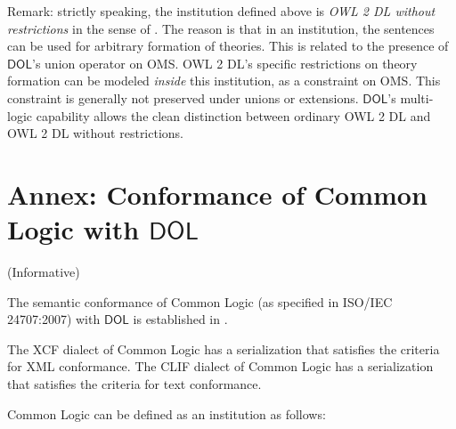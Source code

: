 \documentclass[10pt,fleqn,final]{scrreprt}
\newcommand{\cbe}[0]{\color{black}\xspace} %
\newcommand*{\DOL}{\ensuremath{\mathsf{DOL}}\xspace}
\newcommand{\informative}[0]{{\begin{center}{\Large{(Informative})}\end{center}} \bigskip}
\newcommand{\nisref}[1]{#1}
\newcommand{\infannex}[1]{ \chapter{Annex: #1}  \informative }
\newenvironment{definitions}[0]{\medskip }{}
\begin{document}
\begin{definitions}
\cbe



Remark: strictly speaking, the institution defined above is
\emph{{OWL} 2 DL without restrictions} in the sense of
\cite{DBLP:conf/owled/SchneiderRS13}. The reason is that in an
institution, the sentences can be used for arbitrary formation of
theories. This is related to the presence of \DOL's union operator on
OMS.  OWL 2 DL's specific restrictions on theory formation can be
modeled \emph{inside} this institution, as a constraint on OMS.  This
constraint is generally not preserved under unions or
extensions. \DOL's multi-logic capability allows the clean distinction
between ordinary OWL 2 DL and {OWL} 2 DL without restrictions.


\infannex{Conformance of Common Logic with \DOL}\label{a:cl}

The semantic conformance of Common Logic (as specified in \nisref{ISO/IEC 24707:2007}) with \DOL is established in \cite{OntoGraph}.

The XCF dialect of Common Logic has a serialization that satisfies the criteria for XML conformance.  The CLIF dialect of Common Logic has a serialization that satisfies the criteria for text conformance.

Common Logic can be defined as an institution as follows:


\end{definitions}
\end{document}
